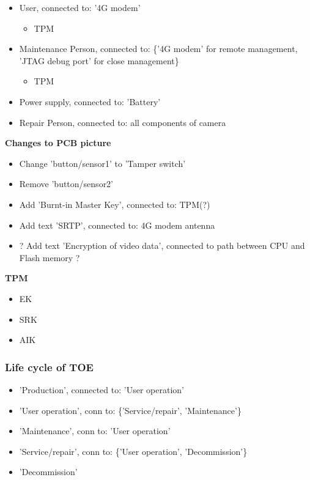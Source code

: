 \documentclass[10pt]{article}
\begin{document}
    \begin{itemize}
      \item User, connected to: '4G modem'
      \begin{itemize}
        \item TPM
      \end{itemize}
      \item Maintenance Person, connected to: \{'4G modem' for remote management, 'JTAG debug port' for close management\}
      \begin{itemize}
        \item TPM
      \end{itemize}
      \item Power supply, connected to: 'Battery'
      \item Repair Person, connected to: all components of camera %
    \end{itemize}
    \textbf{Changes to PCB picture}
    \begin{itemize}
      \item Change 'button/sensor1' to 'Tamper switch'
      \item Remove 'button/sensor2'
      \item Add 'Burnt-in Master Key', connected to: TPM(?) %
      \item Add text 'SRTP', connected to: 4G modem antenna
      \item ? Add text 'Encryption of video data', connected to path between CPU and Flash memory ? %
    \end{itemize}
    \textbf{TPM}
    \begin{itemize} %
      \item EK
      \item SRK
      \item AIK
    \end{itemize}

    \subsubsection{Life cycle of TOE}
    \begin{itemize}
      \item 'Production', connected to: 'User operation'
      \item 'User operation', conn to: \{'Service/repair', 'Maintenance'\}
      \item 'Maintenance', conn to: 'User operation'
      \item 'Service/repair', conn to: \{'User operation', 'Decommission'\}
      \item 'Decommission'
    \end{itemize}
\end{document}
